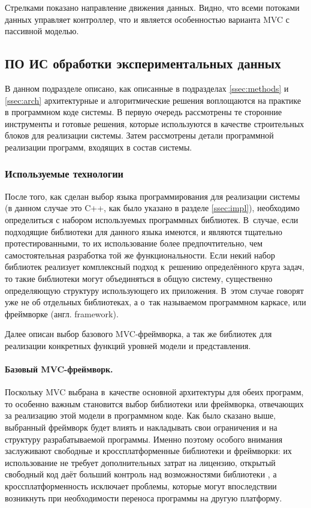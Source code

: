 \documentclass[a4paper, 14pt, titlepage]{extarticle}
\newcommand{\eng}[1]{\foreignlanguage{english}{#1}}
\let\oldparagraph\paragraph
\renewcommand{\paragraph}[1]{\oldparagraph{\indent #1}}
\begin{document}
  Стрелками
  показано направление движения данных. Видно, что всеми потоками данных управляет контроллер, что и
  является особенностью варианта MVC с пассивной моделью.

  \subsection{ПО ИС обработки экспериментальных данных}

  В данном подразделе описано, как описанные в подразделах \ref{ssec:methods} и \ref{ssec:arch}
  архитектурные и алгоритмические решения воплощаются на практике в программном коде системы.
  В первую очередь рассмотрены те сторонние инструменты и готовые решения, которые используются в
  качестве строительных блоков для реализации системы. Затем рассмотрены детали программной
  реализации программ, входящих в состав системы.

  \subsubsection{Используемые технологии}\label{ssec:techno}

  После того, как сделан выбор языка программирования для реализации системы (в данном случае это
  C++, как было указано в разделе \ref{ssec:impl}), необходимо определиться с набором используемых
  программных библиотек. В~случае, если подходящие библиотеки для данного языка имеются, и являются тщательно
  протестированными, то их использование более предпочтительно, чем самостоятельная разработка той
  же функциональности. Если некий набор библиотек реализует комплексный подход к~решению
  определённого круга задач, то такие библиотеки могут объединяться в общую систему, существенно
  определяющую структуру использующего их приложения. В~этом случае говорят уже не об отдельных
  библиотеках, а о~так называемом программном каркасе, или фреймворке (англ. \eng{framework}).

  Далее описан выбор базового MVC-фреймворка, а так же библиотек для реализации
  конкретных функций уровней модели и представления.

  \paragraph{Базовый MVC-фреймворк.}
  Поскольку MVC выбрана в~качестве основной архитектуры для обеих программ, то особенно важным
  становится выбор библиотеки или фреймворка, отвечающих за реализацию этой модели в программном
  коде. Как было сказано выше, выбранный фреймворк будет влиять и накладывать свои ограничения и на
  структуру разрабатываемой программы. Именно поэтому особого внимания заслуживают свободные и
  кроссплатформенные библиотеки и фреймворки: их использование не требует дополнительных затрат на
  лицензию, открытый свободный код даёт больший контроль над возможностями библиотеки \cite{open-source},
  а кроссплатформенность исключает проблемы, которые могут впоследствии возникнуть при необходимости
  переноса программы на другую платформу.
\end{document}

